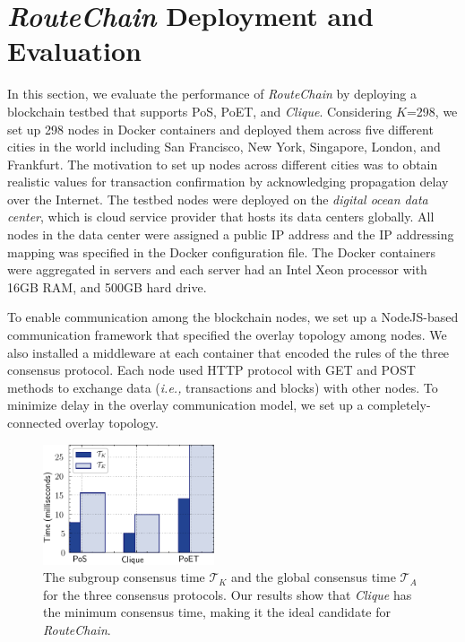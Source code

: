 \documentclass[5p]{elsarticle}
\newcommand{\rc}{{{\em RouteChain}}\xspace}
\newcommand{\ie}{{\em i.e.,}\xspace}
\begin{document}
{\color{blue}
\section{\rc Deployment and Evaluation}\label{sec:simulation}
In this section, we evaluate the performance of \rc by deploying a blockchain testbed that supports PoS, PoET, and {\em Clique}. Considering $K$=298, we set up 298 nodes in Docker containers and deployed them across five different cities in the world including San Francisco, New York, Singapore, London, and Frankfurt. The motivation to set up nodes across different cities was to obtain realistic values for transaction confirmation by acknowledging propagation delay over the Internet. The testbed nodes were deployed on the {\em digital ocean data center}, which is cloud service provider that hosts its data centers globally. All nodes in the data center were assigned a public IP address and the IP addressing mapping was specified in the Docker configuration file. The Docker containers were aggregated in servers and each server had an Intel Xeon processor with 16GB RAM, and 500GB hard drive.


To enable communication among the blockchain nodes, we set up a NodeJS-based communication framework that specified the overlay topology among nodes. We also installed a middleware at each container that encoded the rules of the three consensus protocol. Each node used HTTP protocol with GET and POST methods to exchange data (\ie transactions and blocks) with other nodes. To minimize delay in the overlay communication model, we set up a completely-connected overlay topology. 


\begin{figure}[t]
\begin{center}
\includegraphics[width=0.45\textwidth]{fig/rc_one.pdf}
\caption{The subgroup consensus time $\mathcal{T}_{K}$ and the global consensus time $\mathcal{T}_{A}$ for the three consensus protocols. Our results show that {\em Clique} has the minimum consensus time, making it the ideal candidate for \rc.  } 
\label{fig:simPartial}
\end{center}
\end{figure}

}
\end{document}
